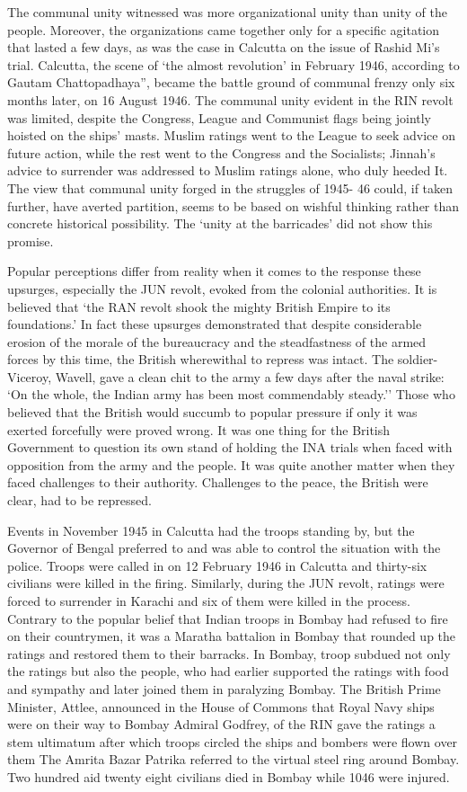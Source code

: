 The communal unity witnessed was more organizational unity than unity of the people. Moreover, the organizations came together only for a specific agitation that lasted a few days, as was the case in Calcutta on the issue of Rashid Mi's trial. Calcutta, the scene of `the almost revolution' in February 1946, according to Gautam Chattopadhaya'', became the battle ground of communal frenzy only six months later, on 16 August 1946. The communal unity evident in the RIN revolt was limited, despite the Congress, League and Communist flags being jointly hoisted on the ships' masts. Muslim ratings went to the League to seek advice on future action, while the rest went to the Congress and the Socialists; Jinnah's advice to surrender was addressed to Muslim ratings alone, who duly heeded It. The view that communal unity forged in the struggles of 1945- 46 could, if taken further, have averted partition, seems to be based on wishful thinking rather than concrete historical possibility. The `unity at the barricades' did not show this promise. 

Popular perceptions differ from reality when it comes to the response these upsurges, especially the JUN revolt, evoked from the colonial authorities. It is believed that `the RAN revolt shook the mighty British Empire to its foundations.' In fact these upsurges demonstrated that despite considerable erosion of the morale of the bureaucracy and the steadfastness of the armed forces by this time, the British wherewithal to repress was intact. The soldier-Viceroy, Wavell, gave a clean chit to the army a few days after the naval strike: `On the whole, the Indian army has been most commendably steady.'' Those who believed that the British would succumb to popular pressure if only it was exerted forcefully were proved wrong. It was one thing for the British Government to question its own stand of holding the INA trials when faced with opposition from the army and the people. It was quite another matter when they faced challenges to their authority. Challenges to the peace, the British were clear, had to be repressed. 

Events in November 1945 in Calcutta had the troops standing by, but the Governor of Bengal preferred to and was able to control the situation with the police. Troops were called in on 12 February 1946 in Calcutta and thirty-six civilians were killed in the firing. Similarly, during the JUN revolt, ratings were forced to surrender in Karachi and six of them were killed in the process. Contrary to the popular belief that Indian troops in Bombay had refused to fire on their countrymen, it was a Maratha battalion in Bombay that rounded up the ratings and restored them to their barracks. In Bombay, troop subdued not only the ratings but also the people, who had earlier supported the ratings with food and sympathy and later joined them in paralyzing Bombay. The British Prime Minister, Attlee, announced in the House of Commons that Royal Navy ships were on their way to Bombay Admiral Godfrey, of the RIN gave the ratings a stem ultimatum after which troops circled the ships and bombers were flown over them The Amrita Bazar Patrika referred to the virtual steel ring around Bombay. Two hundred aid twenty eight civilians died in Bombay while 1046 were injured. 

